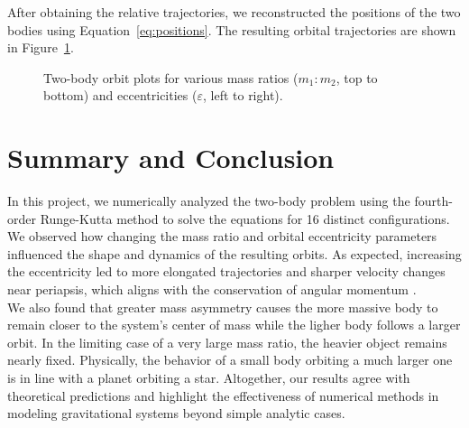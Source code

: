 \documentclass[linenumbers, twocolumn]{aastex631}
\begin{document}
After obtaining the relative trajectories, we reconstructed the positions of the two bodies using 
Equation~\ref{eq:positions}. The resulting orbital trajectories are shown
in Figure~\ref{fig:orbits}.

\begin{figure}[t]
    \centering
    \vspace{-2mm}
    \vspace{-2mm}
    \vspace{-2mm}
    \caption{Two-body orbit plots for various mass ratios ($m_1:m_2$, top
    to bottom) and eccentricities ($\varepsilon$, left to right).}
    \label{fig:orbits}
\end{figure}

\section{Summary and Conclusion} \label{sec:summary}

In this project, we numerically analyzed the two-body problem using the
fourth-order Runge-Kutta method to solve the equations for 16 distinct
configurations. We observed how changing the mass ratio and orbital
eccentricity parameters influenced the shape and dynamics of the resulting
orbits. As expected, increasing the eccentricity led to more elongated 
trajectories and sharper velocity changes near periapsis, which aligns with
the conservation of angular momentum \cite{murray}.\\

\noindent We also found that greater mass asymmetry causes the more massive
body to remain closer to the system's center of mass while the ligher
body follows a larger orbit. In the limiting case of a very large mass ratio,
the heavier object remains nearly fixed. Physically, the behavior of a small
body orbiting a much larger one is in line with a planet orbiting a star. Altogether,
our results agree with theoretical predictions and highlight the effectiveness
of numerical methods in modeling gravitational systems beyond simple analytic
cases.\\
\end{document}

